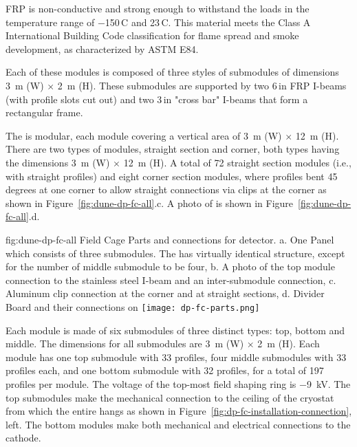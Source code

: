 FRP is non-conductive and strong enough to withstand the \fc loads in the temperature range of \num{-150}\,C and \num{23}\,C.
This material meets the  Class A International Building Code classification for flame spread and smoke development, 
as characterized by ASTM E84. 


Each of these modules is composed of three 
styles of submodules of dimensions \SI{3}{\m} (W) $\times$ \SI{2}{\m} (H). These submodules are supported by two \num{6}\,in FRP I-beams (with profile slots cut out) and two \num{3}\,in "cross bar" I-beams that form a rectangular frame.  


The \fc is modular, each module covering a vertical area of \SI{3}{\m} (W) $\times$ \SI{12}{\m} (H). 
There are two types of modules, straight section and corner, both types having the dimensions \SI{3}{\m} (W) $\times$ \SI{12}{\m} (H). A total of 72 straight section modules (i.e., with straight profiles) and eight corner section modules, where profiles bent \num{45} degrees at one corner to allow straight connections via clips at the corner as shown in Figure~\ref{fig:dune-dp-fc-all}.c.  A photo of  \fc is shown in Figure~\ref{fig:dune-dp-fc-all}.d.

\begin{dunefigure}{fig:dune-dp-fc-all}
{Field Cage Parts and connections for  detector.  a. One   Panel which consists of three submodules.  The  has virtually identical structure, except for the number of middle submodule to be four, b. A photo of the top module connection to the stainless steel I-beam and an inter-submodule connection, c. Aluminum clip connection at the corner and at straight sections, d.  Divider Board and their connections on  \fc }
\texttt{[image: dp-fc-parts.png]}
\end{dunefigure}


Each \fc module is made of six submodules of three distinct types: top, bottom and middle. The dimensions for all submodules are \SI{3}{\m} (W) $\times$ \SI{2}{\m} (H).
Each module has one top submodule with 33 profiles, four middle submodules with 33 profiles each, and one bottom submodule with 32 profiles, for a total of 197 profiles per module. The voltage of the top-most field shaping ring  is \SI{-9}{\kV}. 
The top submodules make the mechanical connection to the ceiling of the cryostat from which the entire \fc hangs as shown in Figure~\ref{fig:dp-fc-installation-connection}, left. The bottom modules make both mechanical and electrical connections to the cathode. 


